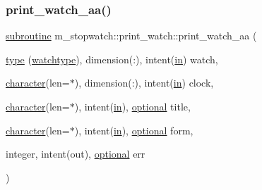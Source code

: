 \subsubsection{\texorpdfstring{print\+\_\+watch\+\_\+aa()}{print\_watch\_aa()}}
{\footnotesize\ttfamily \hyperlink{M__stopwatch_83_8txt_acfbcff50169d691ff02d4a123ed70482}{subroutine} m\+\_\+stopwatch\+::print\+\_\+watch\+::print\+\_\+watch\+\_\+aa (\begin{DoxyParamCaption}\item[{\hyperlink{stop__watch_83_8txt_a70f0ead91c32e25323c03265aa302c1c}{type} (\hyperlink{structm__stopwatch_1_1watchtype}{watchtype}), dimension(\+:), intent(\hyperlink{M__journal_83_8txt_afce72651d1eed785a2132bee863b2f38}{in})}]{watch,  }\item[{\hyperlink{option__stopwatch_83_8txt_abd4b21fbbd175834027b5224bfe97e66}{character}(len=$\ast$), dimension(\+:), intent(\hyperlink{M__journal_83_8txt_afce72651d1eed785a2132bee863b2f38}{in})}]{clock,  }\item[{\hyperlink{option__stopwatch_83_8txt_abd4b21fbbd175834027b5224bfe97e66}{character}(len=$\ast$), intent(\hyperlink{M__journal_83_8txt_afce72651d1eed785a2132bee863b2f38}{in}), \hyperlink{option__stopwatch_83_8txt_aa4ece75e7acf58a4843f70fe18c3ade5}{optional}}]{title,  }\item[{\hyperlink{option__stopwatch_83_8txt_abd4b21fbbd175834027b5224bfe97e66}{character}(len=$\ast$), intent(\hyperlink{M__journal_83_8txt_afce72651d1eed785a2132bee863b2f38}{in}), \hyperlink{option__stopwatch_83_8txt_aa4ece75e7acf58a4843f70fe18c3ade5}{optional}}]{form,  }\item[{integer, intent(out), \hyperlink{option__stopwatch_83_8txt_aa4ece75e7acf58a4843f70fe18c3ade5}{optional}}]{err }\end{DoxyParamCaption})\hspace{0.3cm}{\ttfamily [private]}}

\mbox{\label{interfacem__stopwatch_1_1print__watch_afc3e520135360c46b8a6223eab2acc6c}} 
